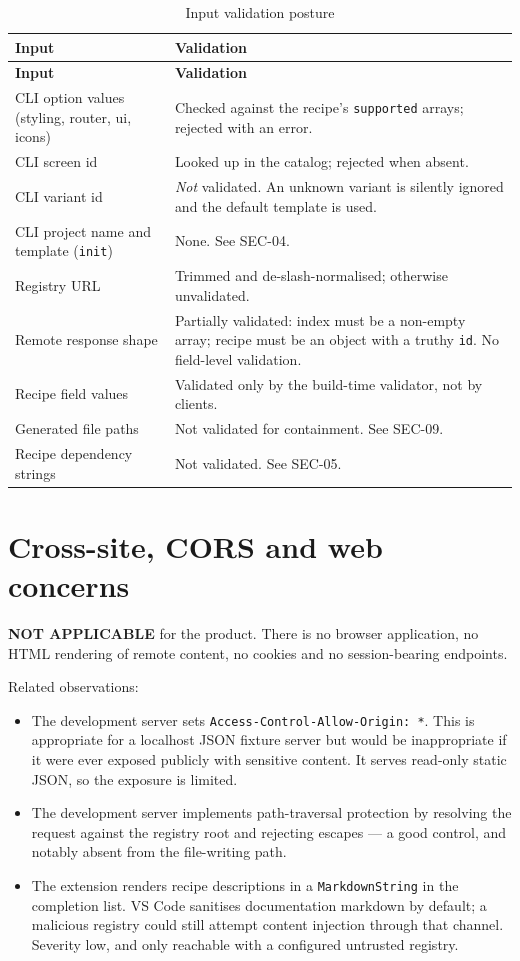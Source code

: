 \begin{longtable}{@{}L{4.4cm}L{9.8cm}@{}}
\caption{Input validation posture}\\
\toprule
\textbf{Input} & \textbf{Validation} \\
\midrule
\endfirsthead
\toprule
\textbf{Input} & \textbf{Validation} \\
\midrule
\endhead
CLI option values (styling, router, ui, icons) & Checked against the recipe's
\texttt{supported} arrays; rejected with an error. \\
CLI screen id & Looked up in the catalog; rejected when absent. \\
CLI variant id & \emph{Not} validated. An unknown variant is silently ignored and the
default template is used. \\
CLI project name and template (\texttt{init}) & None. See SEC-04. \\
Registry URL & Trimmed and de-slash-normalised; otherwise unvalidated. \\
Remote response shape & Partially validated: index must be a non-empty array;
recipe must be an object with a truthy \texttt{id}. No field-level validation. \\
Recipe field values & Validated only by the build-time validator, not by clients. \\
Generated file paths & Not validated for containment. See SEC-09. \\
Recipe dependency strings & Not validated. See SEC-05. \\
\bottomrule
\end{longtable}

\section{Cross-site, CORS and web concerns}

\textbf{NOT APPLICABLE} for the product. There is no browser application, no HTML
rendering of remote content, no cookies and no session-bearing endpoints.

Related observations:
\begin{itemize}
  \item The development server sets
        \texttt{Access-Control-Allow-Origin: *}. This is appropriate for a
        localhost JSON fixture server but would be inappropriate if it were ever
        exposed publicly with sensitive content. It serves read-only static JSON, so
        the exposure is limited.
  \item The development server implements path-traversal protection by resolving
        the request against the registry root and rejecting escapes --- a good
        control, and notably absent from the file-writing path.
  \item The extension renders recipe descriptions in a
        \texttt{MarkdownString} in the completion list. VS Code sanitises
        documentation markdown by default; a malicious registry could still attempt
        content injection through that channel. Severity low, and only reachable
        with a configured untrusted registry.
\end{itemize}

